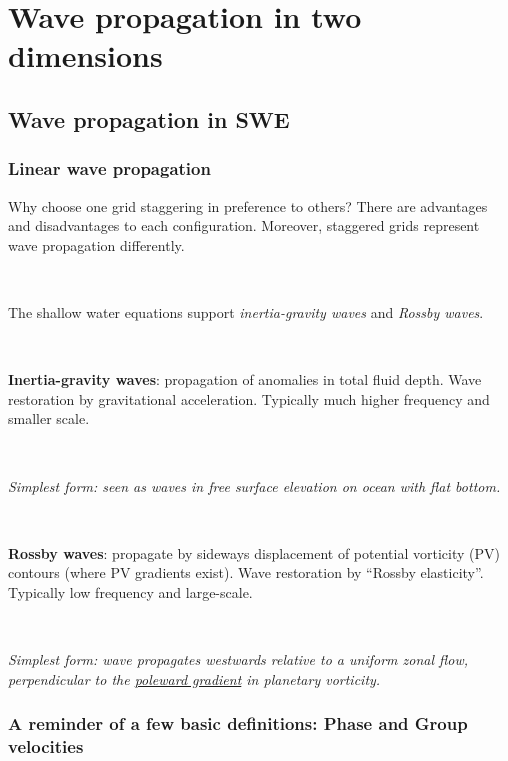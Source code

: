 \chapter{Wave propagation in two dimensions}

\vspace{1em} 

\section{Wave propagation in SWE}
\subsection{Linear wave propagation} 

Why choose one grid staggering in preference to others? There are advantages and disadvantages to each configuration. Moreover, staggered grids represent wave propagation
differently.

~

The shallow water equations support {\em inertia-gravity waves} and  {\em Rossby waves}. 

~

{\bf Inertia-gravity waves}: propagation of anomalies in total fluid
depth. Wave restoration by gravitational acceleration. Typically much
higher frequency and smaller scale.

~

{\em Simplest form: seen as waves in free surface elevation on ocean with
	flat bottom. }

~

{\bf Rossby waves}: propagate by sideways displacement of potential
vorticity (PV) contours (where PV gradients exist). Wave restoration by
``Rossby elasticity''. Typically low frequency and large-scale.

~

{\em Simplest form: wave propagates westwards relative to a uniform
	zonal flow, perpendicular to the \underline{poleward gradient} in planetary
	vorticity.}



\subsection{A reminder of a few basic definitions: Phase and Group velocities}

